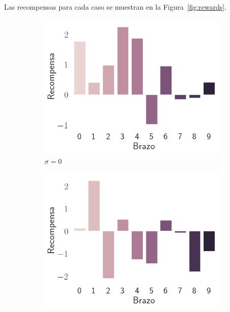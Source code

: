 \documentclass[12pt]{article}
\begin{document}


    Las recompensas para cada caso se muestran en la Figura~\ref{fig:rewards}.

    \begin{figure}[h]
        \centering
        \begin{subfigure}[H]{0.3\textwidth}
            \includegraphics[width=\textwidth]{../img/rewards_sigma_0}
            \caption{$\sigma=0$}
            \label{fig:rewards_0}
        \end{subfigure}
        \begin{subfigure}[H]{0.3\textwidth}
            \includegraphics[width=\textwidth]{../img/rewards_sigma_1}

\end{subfigure}
\end{figure}
\end{document}
